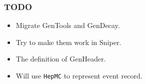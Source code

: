 \begin{frame}
    \frametitle{TODO}
    \begin{itemize}
        \item Migrate GenTools and GenDecay.
        \item Try to make them work in Sniper.
        \item The definition of GenHeader.
        \item Will use {\tt HepMC} to represent event record. 
    \end{itemize}
\end{frame}
